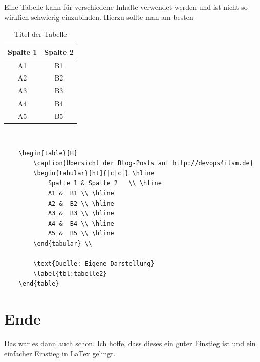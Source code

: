 	
	Eine Tabelle kann für verschiedene Inhalte verwendet werden und ist nicht so wirklich schwierig einzubinden. Hierzu sollte man am besten
			\begin{table}[H]
		\caption{Titel der Tabelle}
		\begin{tabular}[ht]{|c|c|} \hline
			Spalte 1 & Spalte 2   \\ \hline
			A1 &  B1 \\ \hline
			A2 &  B2 \\ \hline 
			A3 &  B3 \\ \hline 
			A4 &  B4 \\ \hline 
			A5 &  B5 \\ \hline 
		\end{tabular} \\
		
		\label{tbl:tabelle2}
	\end{table}

	\begin{verbatim}
	\begin{table}[H]
		\caption{Übersicht der Blog-Posts auf http://devops4itsm.de}
		\begin{tabular}[ht]{|c|c|} \hline
			Spalte 1 & Spalte 2   \\ \hline
			A1 &  B1 \\ \hline
			A2 &  B2 \\ \hline 
			A3 &  B3 \\ \hline 
			A4 &  B4 \\ \hline 
			A5 &  B5 \\ \hline 
		\end{tabular} \\
	
		\text{Quelle: Eigene Darstellung}
		\label{tbl:tabelle2}
	\end{table}
	\end{verbatim}
	
\section{Ende}
	Das war es dann auch schon. Ich hoffe, dass dieses ein guter Einstieg ist und ein einfacher Einstieg in LaTex gelingt.


	
	
	
